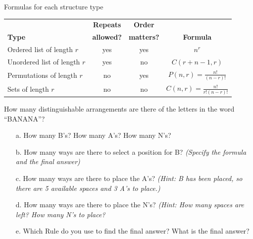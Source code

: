 {    \begin{intro}{Formulas for each structure type}
	
		\begin{center}
			\begin{tabular}{l | c | c | c }
				\textbf{}
					& \textbf{Repeats}
					& \textbf{Order}
					& \textbf{}
				\\
				\textbf{Type}
					& \textbf{allowed?}
					& \textbf{matters?}
					& \textbf{Formula}
				\\ \hline
				Ordered list of length $r$
					& yes
					& yes
					& $n^{r}$

				\\ \hline
				Unordered list of length $r$
					& yes
					& no
					& $C(r + n - 1, r)$
				\\ \hline
				Permutations of length $r$
					& no
					& yes
					& $P(n,r) = \frac{n!}{(n-r)!}$
				\\ \hline
				Sets of length $r$
					& no
					& no
					& $C(n,r) = \frac{n!}{r!(n-r)!}$
			\end{tabular}
		\end{center}
        
    \end{intro}
	
	\newpage
	
    \begin{questionNOGRADE}{\thequestion}
	    How many distinguishable arrangements are there of the letters in the word ``BANANA''?
	    
	    \begin{enumerate}
		    \item[a.]	How many B's?		\tab How many A's?		\tab How many N's?
		    \item[b.]	How many ways are there to select a position for B?
						\textit{(Specify the formula and the final answer)}
			\item[c.]	How many ways are there to place the A's?
						\textit{(Hint: B has been placed, so there are 5 available spaces and 3 A's to place.)}
			\item[d.]	How many ways are there to place the N's?
						\textit{(Hint: How many spaces are left? How many N's to place?}
			\item[e.]	Which Rule do you use to find the final answer? What is the final answer?
		\end{enumerate}
	\end{questionNOGRADE}
	
	\hrulefill
	
}
